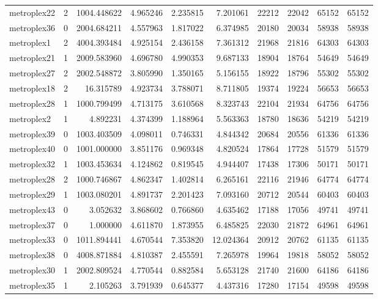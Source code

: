 \begin{longtable}{|l|r|r|r|r|r|r|r|r|r|}
metroplex22 & 2 & 1004.448622 & 4.965246 & 2.235815 & 7.201061 & 22212 & 22042 & 65152 & 65152 \\
metroplex36 & 0 & 2004.684211 & 4.557963 & 1.817022 & 6.374985 & 20180 & 20034 & 58938 & 58938 \\
metroplex1 & 2 & 4004.393484 & 4.925154 & 2.436158 & 7.361312 & 21968 & 21816 & 64303 & 64303 \\
metroplex21 & 1 & 2009.583960 & 4.696780 & 4.990353 & 9.687133 & 18904 & 18764 & 54649 & 54649 \\
metroplex27 & 2 & 2002.548872 & 3.805990 & 1.350165 & 5.156155 & 18922 & 18796 & 55302 & 55302 \\
metroplex18 & 2 & 16.315789 & 4.923734 & 3.788071 & 8.711805 & 19374 & 19224 & 56653 & 56653 \\
metroplex28 & 1 & 1000.799499 & 4.713175 & 3.610568 & 8.323743 & 22104 & 21934 & 64756 & 64756 \\
metroplex2 & 1 & 4.892231 & 4.374399 & 1.188964 & 5.563363 & 18780 & 18636 & 54219 & 54219 \\
metroplex39 & 0 & 1003.403509 & 4.098011 & 0.746331 & 4.844342 & 20684 & 20556 & 61336 & 61336 \\
metroplex40 & 0 & 1001.000000 & 3.851176 & 0.969348 & 4.820524 & 17864 & 17728 & 51579 & 51579 \\
metroplex32 & 1 & 1003.453634 & 4.124862 & 0.819545 & 4.944407 & 17438 & 17306 & 50171 & 50171 \\
metroplex28 & 2 & 1000.746867 & 4.862347 & 1.402814 & 6.265161 & 22116 & 21946 & 64774 & 64774 \\
metroplex29 & 1 & 1003.080201 & 4.891737 & 2.201423 & 7.093160 & 20712 & 20544 & 60403 & 60403 \\
metroplex43 & 0 & 3.052632 & 3.868602 & 0.766860 & 4.635462 & 17188 & 17056 & 49741 & 49741 \\
metroplex37 & 0 & 1.000000 & 4.611870 & 1.873955 & 6.485825 & 22030 & 21872 & 64961 & 64961 \\
metroplex33 & 0 & 1011.894441 & 4.670544 & 7.353820 & 12.024364 & 20912 & 20762 & 61135 & 61135 \\
metroplex38 & 0 & 4008.871884 & 4.810387 & 2.455591 & 7.265978 & 19964 & 19818 & 58052 & 58052 \\
metroplex30 & 1 & 2002.809524 & 4.770544 & 0.882584 & 5.653128 & 21740 & 21600 & 64186 & 64186 \\
metroplex35 & 1 & 2.105263 & 3.791939 & 0.645377 & 4.437316 & 17280 & 17154 & 49598 & 49598 \\

\end{longtable}
